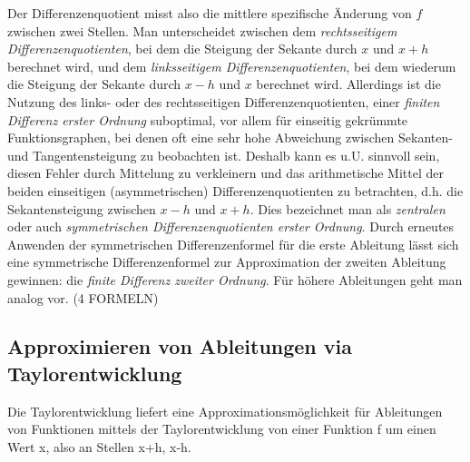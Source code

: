 \documentclass{scrartcl}
\begin{document}
Der Differenzenquotient misst also die mittlere spezifische Änderung von $f$ zwischen zwei Stellen. Man unterscheidet zwischen dem \textit{rechtsseitigem Differenzenquotienten}, bei dem die Steigung der Sekante durch $x$ und $x+h$ berechnet wird, und dem \textit{linksseitigem Differenzenquotienten}, bei dem wiederum die Steigung der Sekante durch $x-h$ und $x$ berechnet wird. Allerdings ist die Nutzung des links- oder des rechtsseitigen Differenzenquotienten, einer \textit{finiten Differenz erster Ordnung} suboptimal, vor allem für einseitig gekrümmte Funktionsgraphen, bei denen oft eine sehr hohe Abweichung zwischen Sekanten- und Tangentensteigung zu beobachten ist. Deshalb kann es u.U. sinnvoll sein, diesen Fehler durch Mittelung zu verkleinern und das arithmetische Mittel der beiden einseitigen (asymmetrischen) Differenzenquotienten zu betrachten, d.h. die Sekantensteigung zwischen $x-h$ und $x+h$. Dies bezeichnet man als \textit{zentralen} oder auch \textit{symmetrischen Differenzenquotienten erster Ordnung}. Durch erneutes Anwenden der symmetrischen Differenzenformel für die erste Ableitung lässt sich eine symmetrische Differenzenformel zur Approximation der zweiten Ableitung gewinnen: die \textit{finite Differenz zweiter Ordnung}. Für höhere Ableitungen geht man analog vor. (4 FORMELN) \\

\subsection{Approximieren von Ableitungen via Taylorentwicklung}
\label{ssec:herleitung2}
Die Taylorentwicklung liefert eine Approximationsmöglichkeit für Ableitungen von Funktionen mittels der Taylorentwicklung von einer Funktion f um einen Wert x, also an Stellen x+h, x-h.
\end{document}
